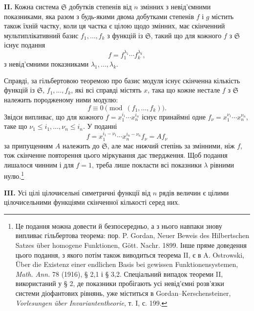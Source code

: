 \documentclass[11pt]{article}
\providecommand{\frS}{\mathfrak S}
\begin{document}
\textbf{II.} Кожна система \(\frS\) добутків степенів від \(n\) змінних з невід'ємними показниками, яка разом з будь-якими двома добутками степенів \(f\) і \(g\) містить також їхній частку, коли ця частка є цілою щодо змінних, має скінченний мультиплікативний базис \(f_1,\ldots,f_k\) з функцій із \(\frS\), такий що для кожного \(f\) з \(\frS\) існує подання
\[
        f=f_1^{\lambda_1}\cdots f_k^{\lambda_k},
\]
з невід'ємними показниками \(\lambda_1,\ldots,\lambda_k\).

Справді, за гільбертовою теоремою про базис модуля існує скінченна кількість функцій із \(\frS\), \(f_1,\ldots,f_k\), які всі справді містять \(x\), така що кожне нестале \(f\) з \(\frS\) належить породженому ними модулю:
\[
        f\equiv0\pmod{(f_1,\ldots,f_k)}.
\]
Звідси випливає, що для кожного \(f=x_1^{i_1}\cdots x_n^{i_n}\) існує принаймні одне \(f_\nu=x_1^{\nu_1}\cdots x_n^{\nu_n}\), таке що \(\nu_1\le i_1,\ldots,\nu_n\le i_n\). У поданні
\[
        f=x_1^{i_1-\nu_1}\cdots x_n^{i_n-\nu_n} f_\nu = A f_\nu
\]
за припущенням \(A\) належить до \(\frS\), але має нижчий степінь за змінними, ніж \(f\), тож скінченне повторення цього міркування дає твердження. Щоб подання лишалося чинним і для \(f=1\), треба лише покласти всі показники \(\lambda\) рівними нулю.\footnote{Це подання можна довести й безпосередньо, а з нього навпаки знову випливає гільбертова теорема: пор. P. Gordan, Neuer Beweis des Hilbertschen Satzes über homogene Funktionen, Gött. Nachr. 1899. Інше пряме доведення цього подання, з якого потім також виводиться теорема II, є в A. Ostrowski, Über die Existenz einer endlichen Basis bei gewissen Funktionensystemen, \emph{Math. Ann.} 78 (1916), § 2,1 і § 3,2. Спеціальний випадок теореми II, використаний у § 2, де показники пробігають усі невід'ємні розв'язки системи діофантових рівнянь, уже міститься в Gordan--Kerschensteiner, \emph{Vorlesungen über Invariantentheorie}, т. I, с. 199.}

\textbf{III.} Усі цілі цілочисельні симетричні функції від \(n\) рядів величин є цілими цілочисельними функціями скінченної кількості серед них.
\end{document}
